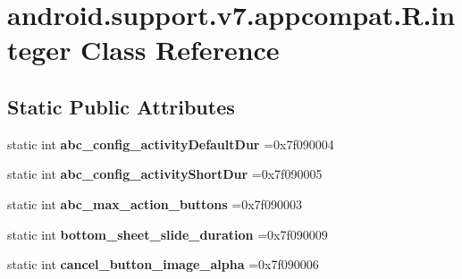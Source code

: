 \hypertarget{classandroid_1_1support_1_1v7_1_1appcompat_1_1R_1_1integer}{}\section{android.\+support.\+v7.\+appcompat.\+R.\+integer Class Reference}
\label{classandroid_1_1support_1_1v7_1_1appcompat_1_1R_1_1integer}
\subsection*{Static Public Attributes}
\begin{DoxyCompactItemize}
\item 
\mbox{\label{classandroid_1_1support_1_1v7_1_1appcompat_1_1R_1_1integer_afb7fa88d2116d1784ba92b0cdbe29f1f}} 
static int {\bfseries abc\+\_\+config\+\_\+activity\+Default\+Dur} =0x7f090004
\item 
\mbox{\label{classandroid_1_1support_1_1v7_1_1appcompat_1_1R_1_1integer_aba1750dc63101fdd644555bdd1bdc7c6}} 
static int {\bfseries abc\+\_\+config\+\_\+activity\+Short\+Dur} =0x7f090005
\item 
\mbox{\label{classandroid_1_1support_1_1v7_1_1appcompat_1_1R_1_1integer_a55294d8c0c78376dda80017105e2e6df}} 
static int {\bfseries abc\+\_\+max\+\_\+action\+\_\+buttons} =0x7f090003
\item 
\mbox{\label{classandroid_1_1support_1_1v7_1_1appcompat_1_1R_1_1integer_a52d36459b9df49478866021c91a71873}} 
static int {\bfseries bottom\+\_\+sheet\+\_\+slide\+\_\+duration} =0x7f090009
\item 
\mbox{\label{classandroid_1_1support_1_1v7_1_1appcompat_1_1R_1_1integer_ae1538b07fbd4fcbfc16ef8138471aa0a}} 
static int {\bfseries cancel\+\_\+button\+\_\+image\+\_\+alpha} =0x7f090006
\item 
\mbox{\label{classandroid_1_1support_1_1v7_1_1appcompat_1_1R_1_1integer_a6511c9a52e87553285227d95d9a3081e}} 

\end{DoxyCompactItemize}

